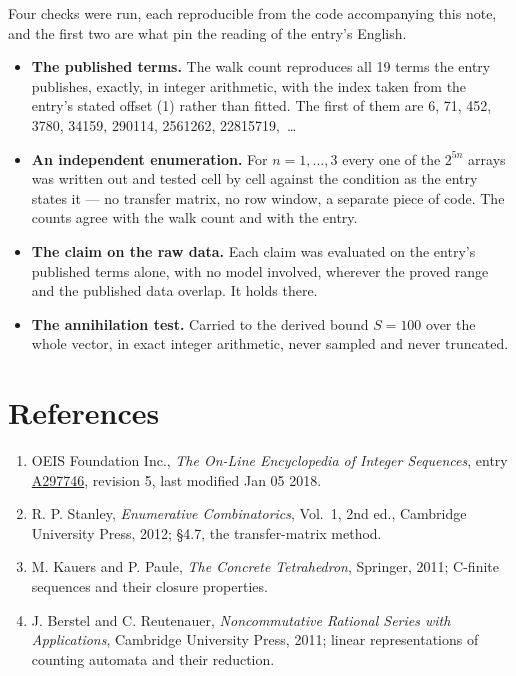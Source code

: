\documentclass[11pt]{article}
\theoremstyle{definition}
\begin{document}
Four checks were run, each reproducible from the code accompanying this note, and the first two are what pin the reading of the entry's English.

\begin{itemize}

\item {\bfseries The published terms.} The walk count reproduces all 19 terms the entry publishes, exactly, in integer arithmetic, with the index taken from the entry's stated offset (1) rather than fitted. The first of them are 6, 71, 452, 3780, 34159, 290114, 2561262, 22815719,~\dots

\item {\bfseries An independent enumeration.} For $n = 1,\dots,3$ every one of the $2^{5n}$ arrays was written out and tested cell by cell against the condition as the entry states it --- no transfer matrix, no row window, a separate piece of code. The counts agree with the walk count and with the entry.

\item {\bfseries The claim on the raw data.} Each claim was evaluated on the entry's published terms alone, with no model involved, wherever the proved range and the published data overlap. It holds there.

\item {\bfseries The annihilation test.} Carried to the derived bound $S = 100$ over the whole vector, in exact integer arithmetic, never sampled and never truncated.

\end{itemize}

\section{References}

\begin{enumerate}

\item OEIS Foundation Inc., \emph{The On-Line Encyclopedia of Integer Sequences}, entry \href{https://oeis.org/A297746}{A297746}, revision 5, last modified Jan 05 2018.

\item R. P. Stanley, \emph{Enumerative Combinatorics}, Vol.~1, 2nd ed., Cambridge University Press, 2012; \S4.7, the transfer-matrix method.

\item M. Kauers and P. Paule, \emph{The Concrete Tetrahedron}, Springer, 2011; C-finite sequences and their closure properties.

\item J. Berstel and C. Reutenauer, \emph{Noncommutative Rational Series with Applications}, Cambridge University Press, 2011; linear representations of counting automata and their reduction.

\end{enumerate}
\end{document}
